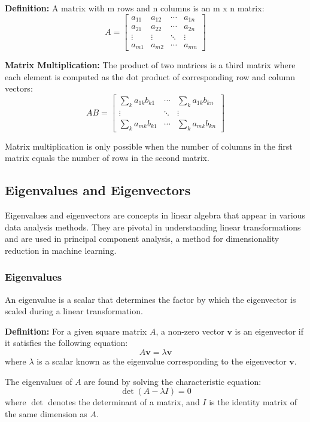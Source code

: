 \documentclass{article}
\begin{document}
	\textbf{Definition:}
	A matrix with m rows and n columns is an m x n matrix:
	\[
	A = \begin{bmatrix}
		a_{11} & a_{12} & \cdots & a_{1n} \\
		a_{21} & a_{22} & \cdots & a_{2n} \\
		\vdots & \vdots & \ddots & \vdots \\
		a_{m1} & a_{m2} & \cdots & a_{mn}
	\end{bmatrix}
	\]
	
	\textbf{Matrix Multiplication:}
	The product of two matrices is a third matrix where each element is computed as the dot product of corresponding row and column vectors:
	\[
	AB = \begin{bmatrix}
		\sum_{k} a_{1k}b_{k1} & \cdots & \sum_{k} a_{1k}b_{kn} \\
		\vdots & \ddots & \vdots \\
		\sum_{k} a_{mk}b_{k1} & \cdots & \sum_{k} a_{mk}b_{kn}
	\end{bmatrix}
	\]
	
	Matrix multiplication is only possible when the number of columns in the first matrix equals the number of rows in the second matrix.
	
	\subsection{Eigenvalues and Eigenvectors}
	Eigenvalues and eigenvectors are concepts in linear algebra that appear in various data analysis methods. They are pivotal in understanding linear transformations and are used in principal component analysis, a method for dimensionality reduction in machine learning.
	
	\subsubsection{Eigenvalues}
	An eigenvalue is a scalar that determines the factor by which the eigenvector is scaled during a linear transformation.
	
	\textbf{Definition:}
	For a given square matrix \( A \), a non-zero vector \( \mathbf{v} \) is an eigenvector if it satisfies the following equation:
	\[
	A\mathbf{v} = \lambda\mathbf{v}
	\]
	where \( \lambda \) is a scalar known as the eigenvalue corresponding to the eigenvector \( \mathbf{v} \).
	
	The eigenvalues of \( A \) are found by solving the characteristic equation:
	\[
	\det(A - \lambda I) = 0
	\]
	where \( \det \) denotes the determinant of a matrix, and \( I \) is the identity matrix of the same dimension as \( A \).
	
\end{document}
